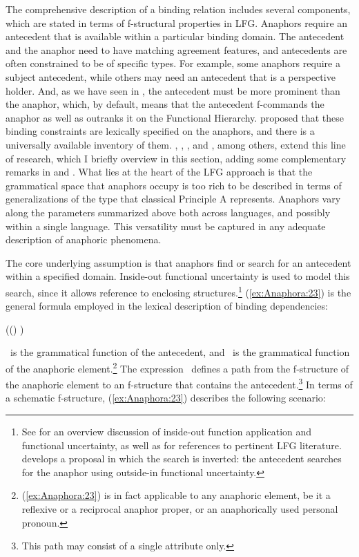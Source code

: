 \documentclass[output=paper,hidelinks]{langscibook}
\begin{document}
The comprehensive description of a binding relation includes several components, which are stated in terms of f-structural properties in LFG. Anaphors require an antecedent that is available within a particular binding domain. The antecedent and the anaphor need to have matching agreement features, and antecedents are often constrained to be of specific types. For example, some anaphors require a subject antecedent, while others may need an antecedent that is a perspective holder. And, as we have seen in , the antecedent must be more prominent than the anaphor, which, by default, means that the antecedent f-commands the anaphor as well as outranks it on the Functional Hierarchy. \citet{dalrymple1993} proposed that these binding constraints are lexically specified on the anaphors, and there is a universally available inventory of them. \citet{dalrymple01}, \citet{DLM:LFG}, \citet{bresnan2001lexical}, and \citet{BresnanEtAl2016}, among others, extend this line of research, which I briefly overview in this section, adding some complementary remarks in  and . What lies at the heart of the LFG approach is that the grammatical space that anaphors occupy is too rich to be described in terms of generalizations of the type that classical Principle A represents. Anaphors vary along the parameters summarized above both across languages, and possibly within a single language. This versatility must be captured in any adequate description of anaphoric phenomena.

The core underlying assumption is that anaphors find or search for an antecedent within a specified domain. Inside-out functional uncertainty is used to model this search, since it allows reference to enclosing structures.\footnote{See  for an overview discussion of inside-out function application and functional uncertainty, as well as for references to pertinent LFG literature. \citet{Strahan:LFG09,Strahan2011} develops a proposal in which the search is inverted: the antecedent searches for the anaphor using outside-in functional uncertainty.} (\ref{ex:Anaphora:23}) is the general formula employed in the lexical description of binding dependencies:

\ea\label{ex:Anaphora:23} ((\GF* \GFPRO\UP) \GFANT)
\z

\GFANT\ is the grammatical function of the antecedent, and \GFPRO\ is the grammatical function of the anaphoric element.\footnote{(\ref{ex:Anaphora:23}) is in fact applicable to any anaphoric element, be it a reflexive or a reciprocal anaphor proper, or an anaphorically used personal pronoun.} The expression \GF*~\GFPRO\UP defines a path from the f-structure of the anaphoric element to an f-structure that contains the antecedent.\footnote{This path may consist of a single attribute only.} In terms of a schematic f-structure, (\ref{ex:Anaphora:23}) describes the following scenario:
\end{document}
